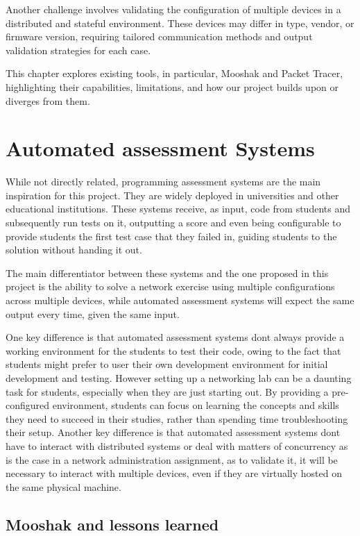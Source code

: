 Another challenge involves validating the configuration of multiple devices in a distributed and stateful environment. These 
devices may differ in type, vendor, or firmware version, requiring tailored communication methods and output validation strategies 
for each case.

This chapter explores existing tools, in particular, Mooshak and Packet Tracer, highlighting their capabilities, limitations, and how our  
project builds upon or diverges from them.

\section{Automated assessment Systems}
    While not directly related, programming assessment systems are the main inspiration for this project. They are widely
    deployed in universities and other educational institutions. These systems receive, as input, code from students and 
    subsequently run tests on it, outputting a score and even being configurable to provide students the first test case that 
    they failed in, guiding students to the solution without handing it out.

    The main differentiator between these systems and the one proposed in this project is the ability to solve a network 
    exercise using multiple configurations across multiple devices, while automated assessment systems will expect
    the same output every time, given the same input.
    
    One key difference is that automated assessment systems dont always provide a working environment for the 
    students to test their code, owing to the fact that students might prefer to user their own development environment for 
    initial development and testing. However setting up a networking lab can be a daunting task for students, especially when 
    they are just starting out. By providing a pre-configured environment, students can focus on learning the concepts and skills 
    they need to succeed in their studies, rather than spending time troubleshooting their setup. Another key difference is that 
    automated assessment systems dont have to interact with distributed systems or deal with matters of concurrency as is the case 
    in a network administration assignment, as to validate it, it will be necessary to interact with multiple devices, even if 
    they are virtually hosted on the same physical machine.

    \subsection{Mooshak and lessons learned}

